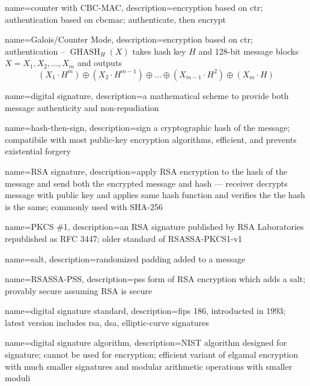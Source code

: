 {
    name={counter with CBC-MAC},
    description={encryption based on \acrfull{ctr}; authentication based on \gls{cbcmac}; authenticate, then encrypt}
}

{
    name={Galois/Counter Mode},
    description={encryption based on \acrfull{ctr}; authentication -- $\operatorname{GHASH}_H(X)$ takes hash key $H$ and 128-bit message blocks $X = X_1, X_2, \dots, X_m$ and outputs \[(X_1\cdot H^m)\oplus(X_2\cdot H^{m-1})\oplus\dots\oplus(X_{m-1}\cdot H^2)\oplus(X_m\cdot H)\]}
}

{
    name={digital signature},
    description={a mathematical scheme to provide both message \gls{authenticity} and \gls{non-repudiation}}
}

{
    name={hash-then-sign},
    description={sign a cryptographic hash of the message; compatibile with most public-key encryption algorithms, efficient, and prevents existential forgery}
}

{
    name={RSA signature},
    description={apply RSA encryption to the hash of the message and send both the encrypted message and hash --- receiver decrypts message with public key and applies same hash function and verifies the the hash is the same; commonly used with SHA-256}
}

{
    name={PKCS \#1},
    description={an RSA signature published by RSA Laboratories republished as RFC 3447; older standard of RSASSA-PKCS1-v1}
}

{
    name={salt},
    description={randomized padding added to a message}
}

{
    name={RSASSA-PSS},
    description={\acrfull{pss} form of RSA encryption which adds a \gls{salt}; provably secure assuming RSA is secure}
}

{
    name={digital signature standard},
    description={\acrfull{fips} 186, introducted in 1993; latest version includes \acrshort{rsa}, \acrshort{dsa}, elliptic-curve signatures}
}

{
    name={digital signature algorithm},
    description={NIST algorithm designed for signature; cannot be used for encryption; efficient variant of \gls{elgamal encryption} with much smaller signatures and modular arithmetic operations with smaller moduli}
}

